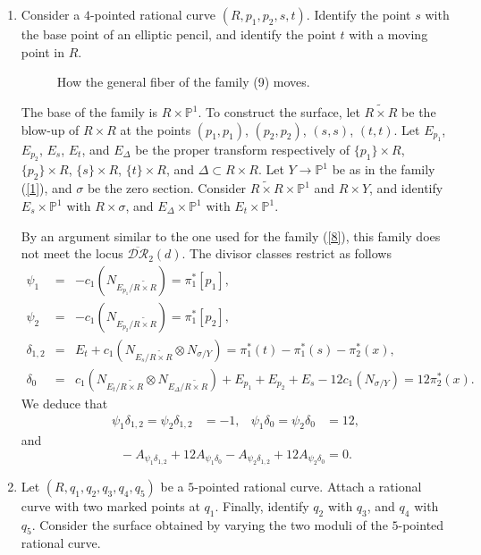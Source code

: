 \documentclass[10pt]{amsart}
\theoremstyle{definition}
\begin{document}
{\begin{enumerate}
\item Consider a $4$-pointed rational curve $(R,p_1,p_2,s,t)$. Identify the point $s$ with the base point of an elliptic pencil, and identify the point $t$ with a moving point in $R$.

\begin{figure}[htbp]
\centering
  
  

  \caption{How the general fiber of the family (9) moves.}
\end{figure}

The base of the family is $R\times \mathbb{P}^1$. To construct the surface, let $\widetilde{R\times R}$ be the blow-up of $R\times R$ at the points $(p_1,p_1)$, $(p_2,p_2)$, $(s,s)$, $(t,t)$. Let $E_{p_1}$, $E_{p_2}$, $E_s$, $E_t$, and $E_\Delta$ be the proper transform respectively of $\{p_1\}\times R$, $\{p_2\}\times R$, $\{s\}\times R$, $\{t\}\times R$, and $\Delta\subset R\times R$. Let $Y\rightarrow\mathbb{P}^1$ be as in the family (\ref{1}), and $\sigma$ be the zero section. Consider $\widetilde{R\times R}\times \mathbb{P}^1$ and $R\times Y$, and identify  $E_s\times\mathbb{P}^1$ with $R\times\sigma$, and $E_\Delta\times\mathbb{P}^1$ with $E_t\times \mathbb{P}^1$.

By an argument similar to the one used for the family (\ref{8}), this family does not meet the locus $\overline{\mathcal{DR}}_2(d)$. The divisor classes restrict as follows
\begin{eqnarray*}
 \psi_1 &=& -c_1\left(N_{E_{p_1}/\widetilde{R\times R}} \right) = \pi_1^*[p_1],\\
 \psi_2 &=& -c_1\left(N_{E_{p_2}/\widetilde{R\times R}} \right) = \pi_1^*[p_2],\\
 \delta_{1,2} &=& E_t + c_1\left(N_{E_s/\widetilde{R\times R}} \otimes N_{\sigma/Y} \right)= \pi_1^*(t) -\pi_1^*(s) -\pi_2^*(x),\\
 \delta_0 &=& c_1\left(N_{E_t/\widetilde{R\times R}}\otimes N_{E_\Delta/\widetilde{R\times R}} \right)+E_{p_1}+E_{p_2}+E_s -12 c_1\left(N_{\sigma/Y} \right)= 12\pi_2^*(x).
\end{eqnarray*}
We deduce that
\begin{align*}
\psi_1\delta_{1,2} = \psi_2\delta_{1,2} &= -1, & \psi_1\delta_0 = \psi_2\delta_0 &=12,
\end{align*}
and
\[
 {}-A_{\psi_1\delta_{1,2}}+12A_{\psi_1\delta_0}-A_{\psi_2\delta_{1,2}}+12A_{\psi_2\delta_0}=0.
\]

\item Let $(R, q_1, q_2, q_3, q_4, q_5)$ be a $5$-pointed rational curve. Attach a rational curve with two marked points at $q_1$. Finally, identify $q_2$ with $q_3$, and $q_4$ with $q_5$. Consider the surface obtained by varying the two moduli of the $5$-pointed rational curve.


\end{enumerate}}
\end{document}
